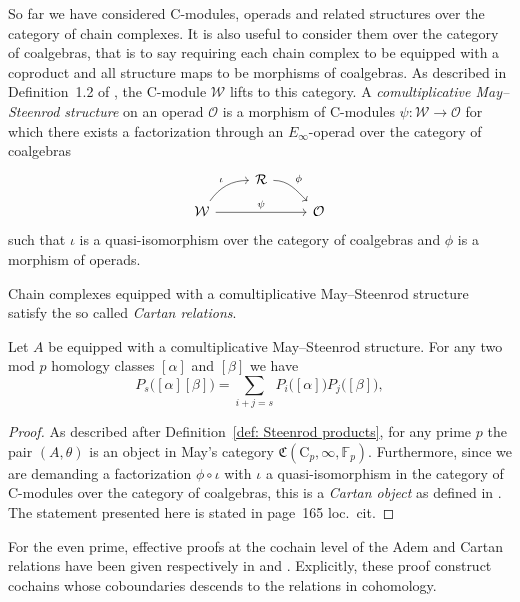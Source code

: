 So far we have considered $\mathrm{C}$-modules, operads and related structures over the category of chain complexes.
It is also useful to consider them over the category of coalgebras, that is to say requiring each chain complex to be equipped with a coproduct and all structure maps to be morphisms of coalgebras.
As described in Definition~1.2 of \cite{may1970general}, the $\mathrm{C}$-module $\mathcal W$ lifts to this category.
A \textit{comultiplicative May--Steenrod structure} on an operad $\mathcal O$ is a morphism of $\mathrm{C}$-modules $\psi \colon \mathcal W \to \mathcal O$ for which there exists a factorization through an $E_\infty$-operad over the category of coalgebras
\begin{equation*}
\begin{tikzcd}[column sep = normal, row sep = small]
& \mathcal R \arrow[dr, "\phi", out=0] & \\
\mathcal W \arrow[ur, "\iota", out=55, in=180] \arrow[rr, "\psi"] & & \mathcal O
\end{tikzcd}
\end{equation*}
such that $\iota$ is a quasi-isomorphism over the category of coalgebras and $\phi$ is a morphism of operads.

Chain complexes equipped with a comultiplicative May--Steenrod structure satisfy the so called \textit{Cartan relations}.

\begin{lemma}
	Let $A$ be equipped with a comultiplicative May--Steenrod structure.
	For any two mod $p$ homology classes $[\alpha]$ and $[\beta]$ we have
	\begin{equation*}
	P_s\big([\alpha] [\beta]\big) = \sum_{i+j=s} P_i\big( [\alpha] \big) P_j\big( [\beta] \big),
	\end{equation*}
\end{lemma}

\begin{proof}
	As described after Definition~\ref{def: Steenrod products}, for any prime $p$ the pair $(A, \theta)$ is an object in May's category $\mathfrak{C}(\mathrm C_p, \infty, \mathbb{F}_p)$.
	Furthermore, since we are demanding a factorization $\phi \circ \iota$ with $\iota$ a quasi-isomorphism in the category of $\mathrm{C}$-modules over the category of coalgebras, this is a \textit{Cartan object} as defined in \cite[p.161]{may1970general}.
	The statement presented here is stated in page~165 loc.~cit.
\end{proof}

For the even prime, effective proofs at the cochain level of the Adem and Cartan relations have been given respectively in \cite{medina2021adem} and \cite{medina2020cartan}.
Explicitly, these proof construct cochains whose coboundaries descends to the relations in cohomology.
